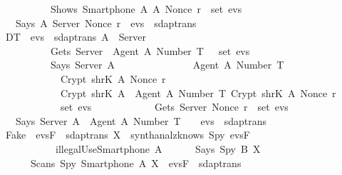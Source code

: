 \begin{isabellebody}
  \ \ \ \ \ \ \ \ \ \ \ \ Shows\ {\isacharparenleft}Smartphone\ A{\isacharparenright}\ A\ {\isacharparenleft}Nonce\ r{\isacharparenright}\ {\isasymin}\ set\ evs{}\ {\isasymrbrakk}\isanewline
  \ \ \ \ {\isasymLongrightarrow}\ Says\ A\ Server\ {\isacharparenleft}Nonce\ r{\isacharparenright}\ {\isacharhash}\ evs{}\ {\isasymin}\ sdaptrans{\isachardoublequoteclose}\isanewline
  \isanewline
  \ \ {\isacharbar}\ DT{}{\isacharcolon}\ {\isachardoublequoteopen}{\isasymlbrakk}\ evs{}\ {\isasymin}\ sdaptrans{\isacharsemicolon}\ A\ {\isasymnoteq}\ Server{\isacharsemicolon}\isanewline
  \ \ \ \ \ \ \ \ \ \ \ \ Gets\ Server\ {\isasymlbrace}\ Agent\ A{\isacharcomma}\ Number\ T\ {\isasymrbrace}\ {\isasymin}\ set\ evs{}{\isacharsemicolon}\isanewline
  \ \ \ \ \ \ \ \ \ \ \ \ Says\ Server\ A\ {\isasymlbrace}\isanewline
  \ \ \ \ \ \ \ \ \ \ \ \ \ \ {\isasymlbrace}Agent\ A{\isacharcomma}\ Number\ T{\isasymrbrace}{\isacharcomma}\isanewline
  \ \ \ \ \ \ \ \ \ \ \ \ \ \ Crypt\ {\isacharparenleft}shrK\ A{\isacharparenright}\ {\isacharparenleft}Nonce\ r{\isacharparenright}{\isacharcomma}\isanewline
  \ \ \ \ \ \ \ \ \ \ \ \ \ \ Crypt\ {\isacharparenleft}shrK\ A{\isacharparenright}\ {\isasymlbrace}\ {\isasymlbrace}Agent\ A{\isacharcomma}\ Number\ T{\isasymrbrace}{\isacharcomma}\ Crypt\ {\isacharparenleft}shrK\ A{\isacharparenright}\ {\isacharparenleft}Nonce\ r{\isacharparenright}\ {\isasymrbrace}\isanewline
  \ \ \ \ \ \ \ \ \ \ \ \ {\isasymrbrace}\ {\isasymin}\ set\ evs{}{\isacharsemicolon}\isanewline
  \ \ \ \ \ \ \ \ \ \ \ \ Gets\ Server\ {\isacharparenleft}Nonce\ r{\isacharparenright}\ {\isasymin}\ set\ evs{}\ {\isasymrbrakk}\isanewline
  \ \ \ \ {\isasymLongrightarrow}\ Says\ Server\ A\ {\isasymlbrace}\ Agent\ A{\isacharcomma}\ Number\ T\ {\isasymrbrace}\ \ {\isacharhash}\ evs{}\ {\isasymin}\ sdaptrans{\isachardoublequoteclose}\isanewline
  \isanewline
  \ \ \isanewline
  \ \ {\isacharbar}\ Fake{\isacharcolon}\ {\isachardoublequoteopen}{\isasymlbrakk}\ evsF\ {\isasymin}\ sdaptrans{\isacharsemicolon}\ X\ {\isasymin}\ synth{\isacharparenleft}analz{\isacharparenleft}knows\ Spy\ evsF{\isacharparenright}{\isacharparenright}{\isacharsemicolon}\isanewline
  \ \ \ \ \ \ \ \ \ \ \ \ \ illegalUse{\isacharparenleft}Smartphone\ A{\isacharparenright}\ {\isasymrbrakk}\isanewline
  \ \ \ \ {\isasymLongrightarrow}\ Says\ Spy\ B\ X\ {\isacharhash}\isanewline
  \ \ \ \ \ \ \ \ Scans\ Spy\ {\isacharparenleft}Smartphone\ A{\isacharparenright}\ X\ {\isacharhash}\ evsF\ {\isasymin}\ sdaptrans{\isachardoublequoteclose}\isanewline

\end{isabellebody}
